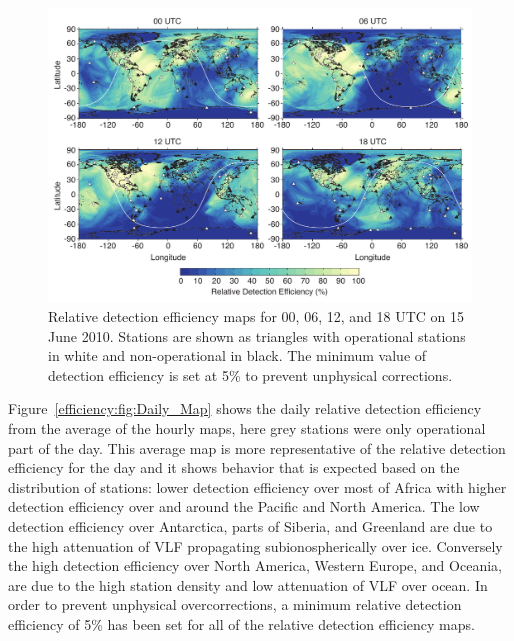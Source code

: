 \begin{figure}[ht!]
   \centering
\noindent\includegraphics[scale=0.8]{efficiency/Figures/2012RS005049-p6.pdf}
   \caption{Relative detection efficiency maps for 00, 06, 12, and 18 UTC on 15 June 2010.
Stations are shown as triangles with operational stations in white and non-operational in black.
The minimum value of detection efficiency is set at 5\% to prevent unphysical corrections.}
   \label{efficiency:fig:Hour_Maps}
\end{figure}

Figure~\ref{efficiency:fig:Daily_Map} shows the daily relative detection efficiency from the average of the hourly maps, here grey stations were only operational part of the day.
This average map is more representative of the relative detection efficiency for the day and it shows behavior that is expected based on the distribution of stations: lower detection efficiency over most of Africa with higher detection efficiency over and around the Pacific and North America.
The low detection efficiency over Antarctica, parts of Siberia, and Greenland are due to the high attenuation of VLF propagating subionospherically over ice.
Conversely the high detection efficiency over North America, Western Europe, and Oceania, are due to the high station density and low attenuation of VLF over ocean.
In order to prevent unphysical overcorrections, a minimum relative detection efficiency of 5\% has been set for all of the relative detection efficiency maps.

